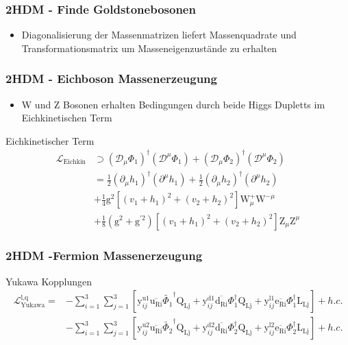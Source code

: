 \documentclass[xcolor=dvipsnames]{beamer}
\begin{document}
\begin{frame}[t]
\frametitle{2HDM - Finde Goldstonebosonen}
\begin{itemize}
\item Diagonalisierung der Massenmatrizen liefert Massenquadrate und Transformationsmatrix um Masseneigenzustände zu erhalten
\end{itemize}
\end{frame}
\begin{frame}
\frametitle{2HDM - Eichboson Massenerzeugung}
\begin{itemize}
\item W und Z Bosonen erhalten Bedingungen durch beide Higgs Dupletts im Eichkinetischen Term 
\end{itemize}
\begin{block}{Eichkinetischer Term}
\begin{align*}
\mathscr{L}_{\text{Eichkin}} &\supset (\mathscr{D}_{\mu}\Phi_{1})^{\dagger}(\mathscr{D}^{\mu}\Phi_{1})+(\mathscr{D}_{\mu}\Phi_{2})^{\dagger}(\mathscr{D}^{\mu}\Phi_{2}) \\
&= \frac{1}{2} (\partial_{\mu}h_{1})^{\dagger}(\partial^{\mu}h_{1})+\frac{1}{2}(\partial_{\mu}h_{2})^{\dagger}(\partial^{\mu}h_{2}) \\
&+\frac{1}{4} \text{g}^2 [(v_{1}+h_{1})^{2}+(v_{2}+h_{2})^{2}]\text{W}_{\mu}^{+}\text{W}^{-\mu}\\
&+\frac{1}{8} (\text{g}^{2}+\text{g}^{\prime2}) [(v_{1}+h_{1})^{2}+(v_{2}+h_{2})^{2}]\text{Z}_{\mu}\text{Z}^{\mu}
\end{align*}
\end{block}
\end{frame}



\begin{frame}
\frametitle{2HDM -Fermion Massenerzeugung}
\begin{block}{Yukawa Kopplungen}
\begin{align*}
\mathscr{L}_{\text{Yukawa}}^{\text{l,q}}=&- \sum_{i=1}^{3} \sum_{j=1}^{3} [\text{y}^{\text{u1}}_{ij}\overline{\text{u}_{\text{Ri}}} \tilde{\Phi_{1}}^{\dagger}\text{Q}_{\text{Lj}}+\text{y}^{\text{d1}}_{ij} \overline{\text{d}_{\text{Ri}}}\Phi_{1}^{\dagger} \text{Q}_{\text{Lj}}+\text{y}^{\text{l1}}_{ij} \overline{\text{e}_{\text{Ri}}}\Phi_{1}^{\dagger} \text{L}_{\text{Lj}}]+h.c.\\
&- \sum_{i=1}^{3} \sum_{j=1}^{3} [\text{y}^{\text{u2}}_{ij}\overline{\text{u}_{\text{Ri}}} \tilde{\Phi_{2}}^{\dagger}\text{Q}_{\text{Lj}}+\text{y}^{\text{d2}}_{ij} \overline{\text{d}_{\text{Ri}}}\Phi_{2}^{\dagger} \text{Q}_{\text{Lj}}+\text{y}^{\text{l2}}_{ij} \overline{\text{e}_{\text{Ri}}}\Phi_{2}^{\dagger} \text{L}_{\text{Lj}}]+h.c.
\end{align*}
\end{block}
\end{frame}
\end{document}
